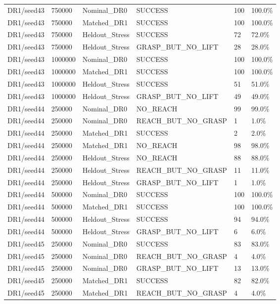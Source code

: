 \documentclass[11pt,a4paper,oneside]{book}
\begin{document}
\begin{longtable}{l l l l l l}
DR1/seed43 & 750000 & Nominal\_DR0 & SUCCESS & 100 & 100.0\% \\
DR1/seed43 & 750000 & Matched\_DR1 & SUCCESS & 100 & 100.0\% \\
DR1/seed43 & 750000 & Heldout\_Stress & SUCCESS & 72 & 72.0\% \\
DR1/seed43 & 750000 & Heldout\_Stress & GRASP\_BUT\_NO\_LIFT & 28 & 28.0\% \\
DR1/seed43 & 1000000 & Nominal\_DR0 & SUCCESS & 100 & 100.0\% \\
DR1/seed43 & 1000000 & Matched\_DR1 & SUCCESS & 100 & 100.0\% \\
DR1/seed43 & 1000000 & Heldout\_Stress & SUCCESS & 51 & 51.0\% \\
DR1/seed43 & 1000000 & Heldout\_Stress & GRASP\_BUT\_NO\_LIFT & 49 & 49.0\% \\
DR1/seed44 & 250000 & Nominal\_DR0 & NO\_REACH & 99 & 99.0\% \\
DR1/seed44 & 250000 & Nominal\_DR0 & REACH\_BUT\_NO\_GRASP & 1 & 1.0\% \\
DR1/seed44 & 250000 & Matched\_DR1 & SUCCESS & 2 & 2.0\% \\
DR1/seed44 & 250000 & Matched\_DR1 & NO\_REACH & 98 & 98.0\% \\
DR1/seed44 & 250000 & Heldout\_Stress & NO\_REACH & 88 & 88.0\% \\
DR1/seed44 & 250000 & Heldout\_Stress & REACH\_BUT\_NO\_GRASP & 11 & 11.0\% \\
DR1/seed44 & 250000 & Heldout\_Stress & GRASP\_BUT\_NO\_LIFT & 1 & 1.0\% \\
DR1/seed44 & 500000 & Nominal\_DR0 & SUCCESS & 100 & 100.0\% \\
DR1/seed44 & 500000 & Matched\_DR1 & SUCCESS & 100 & 100.0\% \\
DR1/seed44 & 500000 & Heldout\_Stress & SUCCESS & 94 & 94.0\% \\
DR1/seed44 & 500000 & Heldout\_Stress & GRASP\_BUT\_NO\_LIFT & 6 & 6.0\% \\
DR1/seed45 & 250000 & Nominal\_DR0 & SUCCESS & 83 & 83.0\% \\
DR1/seed45 & 250000 & Nominal\_DR0 & REACH\_BUT\_NO\_GRASP & 4 & 4.0\% \\
DR1/seed45 & 250000 & Nominal\_DR0 & GRASP\_BUT\_NO\_LIFT & 13 & 13.0\% \\
DR1/seed45 & 250000 & Matched\_DR1 & SUCCESS & 82 & 82.0\% \\
DR1/seed45 & 250000 & Matched\_DR1 & REACH\_BUT\_NO\_GRASP & 4 & 4.0\% \\

\end{longtable}
\end{document}
